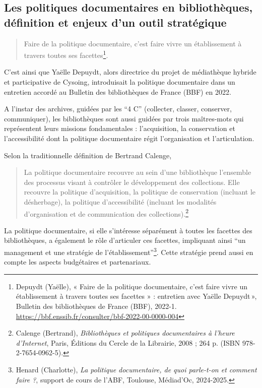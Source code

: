 
\subsection*{Les politiques documentaires en bibliothèques, définition et enjeux d'un outil stratégique}

\begin{quotation}
		Faire de la politique documentaire, c'est faire vivre un établissement à travers toutes ses facettes\footnote{Depuydt (Yaëlle), « Faire de la politique documentaire, c’est faire vivre un établissement à travers toutes ses facettes » : entretien avec Yaëlle Depuydt », Bulletin des bibliothèques de France (BBF), 2022-1. \url{https://bbf.enssib.fr/consulter/bbf-2022-00-0000-004}}.
\end{quotation}
C'est ainsi que Yaëlle Depuydt, alors directrice du projet de médiathèque hybride et participative de Cysoing, introduisait la politique documentaire dans un entretien accordé au Bulletin des bibliothèques de France (BBF) en 2022. 

A l'instar des archives, guidées par les \enquote{4 C} (collecter, classer, conserver, communiquer), les bibliothèques sont aussi guidées par trois maîtres-mots qui représentent leurs missions fondamentales  : l'acquisition, la conservation et l'accessibilité dont la politique documentaire régit l'organisation et l'articulation.

Selon la traditionnelle définition de Bertrand Calenge, 
\begin{quotation}
	La politique documentaire recouvre au sein d'une bibliothèque l'ensemble des processus visant à contrôler le développement des collections. Elle recouvre la politique d'acquisition, la politique de conservation (incluant le désherbage), la politique d'accessibilité (incluant les modalités d'organisation et de communication des collections).\footnote{Calenge (Bertrand), \textit{Bibliothèques et politiques documentaires à l'heure d'Internet}, Paris, Éditions du Cercle de la Librairie, 2008 ; 264 p. (ISBN 978-2-7654-0962-5).}
\end{quotation}

La politique documentaire, si elle s'intéresse séparément à toutes les facettes des bibliothèques, a également le rôle d'articuler ces facettes, impliquant ainsi \enquote{un management et une stratégie de l'établissement}\footnote{Henard (Charlotte), \textit{La politique documentaire, de quoi parle-t-on et comment faire ?}, support de cours de l'ABF, Toulouse, Médiad'Oc, 2024-2025.}. Cette stratégie prend aussi en compte les aspects budgétaires et partenariaux.


